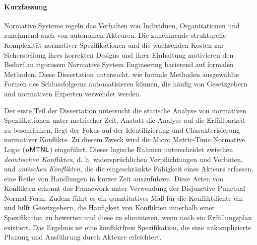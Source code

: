 
\cleardoublepage
\thispagestyle{plain}

\paragraph{Kurzfassung}

Normative Systeme regeln das Verhalten von Individuen, Organisationen und zunehmend auch von autonomen Akteuren. Die zunehmende strukturelle Komplexität normativer Spezifikationen und die wachsenden Kosten zur Sicherstellung ihres korrekten Designs und ihrer Einhaltung motivieren den Bedarf an rigorosem Normative System Engineering basierend auf formalen Methoden. Diese Dissertation untersucht, wie formale Methoden ausgewählte Formen des Schlussfolgerns automatisieren können, die häufig von Gesetzgebern und normativen Experten verwendet werden.

Der erste Teil der Dissertation untersucht die statische Analyse von normativen Spezifikationen unter metrischer Zeit. Anstatt die Analyse auf die Erfüllbarkeit zu beschränken, liegt der Fokus auf der Identifizierung und Charakterisierung normativer Konflikte. Zu diesem Zweck wird die Micro Metric-Time Normative Logic ($\mathsf{\mu MTNL}$) eingeführt. Dieser logische Rahmen unterscheidet zwischen \textit{deontischen Konflikten}, d. h. widersprüchlichen Verpflichtungen und Verboten, und \textit{ontischen Konflikten}, die die eingeschränkte Fähigkeit eines Akteurs erfassen, eine Reihe von Handlungen in kurzer Zeit auszuführen. Diese Arten von Konflikten erkennt das Framework unter Verwendung der Disjunctive Punctual Normal Form. Zudem führt es ein quantitatives Maß für die Konfliktdichte ein und hilft Gesetzgebern, die Häufigkeit von Konflikten innerhalb einer Spezifikation zu bewerten und diese zu eliminieren, wenn noch ein Erfüllungsplan existiert. Das Ergebnis ist eine konfliktfreie Spezifikation, die eine unkomplizierte Planung und Ausführung durch Akteure erleichtert.

